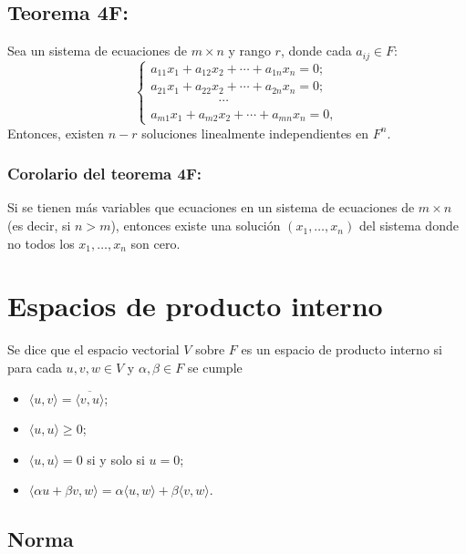 \documentclass{article}
\begin{document}
\subsection*{\color{red} Teorema 4F:}

Sea un sistema de ecuaciones de $m\times n$ y rango $r$, donde cada $a_{ij}\in F$:
$$\begin{cases}
    a_{11}x_1+a_{12}x_2+\cdots+a_{1n}x_n=0; \\
    a_{21}x_1+a_{22}x_2+\cdots+a_{2n}x_n=0; \\
    \hspace{64pt}\cdots\\
    a_{m1}x_1+a_{m2}x_2+\cdots+a_{mn}x_n=0,
  \end{cases}$$
Entonces, existen $n-r$ soluciones linealmente independientes en $F^n$.

\subsubsection*{\color{red} Corolario del teorema 4F:}

Si se tienen más variables que ecuaciones en un sistema de ecuaciones de $m\times n$ (es decir, si $n>m$), entonces existe una solución $(x_1,\ldots,x_n)$ del sistema donde no todos los $x_1,\ldots,x_n$ son cero.

\newpage
\section{Espacios de producto interno}

Se dice que el espacio vectorial $V$ sobre $F$ es un espacio de producto interno si para cada $u,v,w\in V$ y $\alpha,\beta\in F$ se cumple

\begin{itemize}
\item $\langle u,v \rangle=\overline{\langle v,u \rangle}$;

\item $\langle u,u \rangle\geq 0$;

\item $\langle u,u \rangle=0$ si y solo si $u=0$;

\item $\langle \alpha u+\beta v,w \rangle=\alpha\langle u,w \rangle+\beta\langle v,w \rangle$.
\end{itemize}

\subsection*{\color{violet} Norma}
\end{document}

